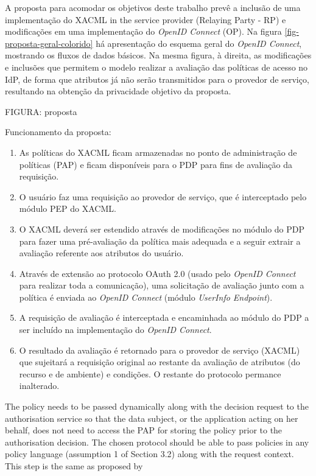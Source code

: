 \documentclass{doublecol-new}
\begin{document}
A proposta para acomodar os objetivos deste trabalho prevê a inclusão de uma implementação do XACML in the service provider (Relaying Party - RP) e modificações em uma implementação do \textit{OpenID Connect} (OP). Na figura \ref{fig-proposta-geral-colorido} há apresentação do esquema geral do \textit{OpenID Connect}, mostrando os fluxos de dados básicos. Na mesma figura, à direita, as modificações e inclusões que permitem o modelo realizar a avaliação das políticas de acesso no IdP, de forma que atributos já não serão transmitidos para o provedor de serviço, resultando na obtenção da privacidade objetivo da proposta. 

FIGURA: proposta

Funcionamento da proposta: 
\begin{enumerate}
	\item As políticas do XACML ficam armazenadas no ponto de administração de políticas (PAP) e ficam disponíveis para o PDP para fins de avaliação da requisição.
	\item O usuário faz uma requisição ao provedor de serviço, que é interceptado pelo módulo PEP do XACML.
	\item O XACML deverá ser estendido através de modificações no módulo do PDP para fazer uma pré-avaliação da política mais adequada e a seguir extrair a avaliação referente aos atributos do usuário.
	\item Através de extensão ao protocolo OAuth 2.0 (usado pelo \textit{OpenID Connect} para realizar toda a comunicação), uma solicitação de avaliação junto com a política é enviada ao \textit{OpenID Connect} (módulo \textit{UserInfo Endpoint}).
	\item A requisição de avaliação é interceptada e encaminhada ao módulo do PDP a ser incluído na implementação do \textit{OpenID Connect}.
	\item O resultado da avaliação é retornado para o provedor de serviço (XACML) que sujeitará a requisição original ao restante da avaliação de atributos (do recurso e de ambiente) e condições. O restante do protocolo permance inalterado.
\end{enumerate}   


The policy needs to be passed dynamically along with the decision request to the authorisation service so that the data
subject, or the application acting on her behalf, does not need to access the PAP for storing the policy prior to the authorisation decision. The chosen protocol should be able to pass policies in any policy language (assumption 1 of Section 3.2) along with the request context.
This step is the same as proposed by \cite{chadwick2012privacy} \cite{fatema2013adding}
\end{document}
